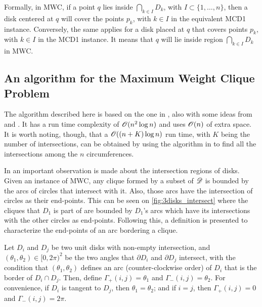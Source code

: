 Formally, in MWC, if a point $q$ lies inside $\bigcap_{k \in I} D_k$, with $I \subset \{1,\dots,n\}$, then a disk centered at $q$ will cover the points $p_k$, with $k\in I$ in the equivalent MCD1 instance. Conversely, the same applies for a disk placed at $q$ that covers points $p_k$, with $k \in I$ in the MCD1 instance. It means that $q$ will lie inside region $\bigcap_{k \in I} D_k$ in MWC.

\subsection{An algorithm for the Maximum Weight Clique Problem}

The algorithm described here is based on the one in , also with some ideas from  and . It has a run time complexity of $\mathscr{O}(n^2\log{n})$ and uses $\mathscr{O}(n)$ of extra space. It is worth noting, though, that a $\mathscr{O}((n+K)\log{n})$ run time, with $K$ being the number of intersections, can be obtained by using the algorithm in  to find all the intersections among the $n$ circumferences.

In  an important observation is made about the intersection regions of disks. Given an instance of MWC, any clique formed by a subset of $\mathscr{D}$ is bounded by the arcs of circles that intersect with it. Also, those arcs have the intersection of circles as their end-points. This can be seen on \autoref{fig:3disks_intersect} where the cliques that $D_1$ is part of are bounded by $D_1$'s arcs which have its intersections with the other circles as end-points. Following this, a definition is presented to characterize the end-points of an arc bordering a clique.

\begin{definicao}\label{def:inter_arc}
    Let $D_i$ and $D_j$ be two unit disks with non-empty intersection, and \mbox{$(\theta_1, \theta_2) \in [0,2\pi)^2$} be the two angles that $\partial D_i$ and $\partial D_j$ intersect, with the condition that $(\theta_1,\theta_2)$ defines an arc (counter-clockwise order) of $D_i$ that is the border of $D_i \cap D_j$. Then, define $\Gamma_+(i,j) = \theta_1$ and $\Gamma_-(i,j) = \theta_2$. For convenience, if $D_i$ is tangent to $D_j$, then $\theta_1=\theta_2$; and if $i=j$, then $\Gamma_+(i, j)=0$ and $\Gamma_-(i,j)=2\pi$.
\end{definicao}

